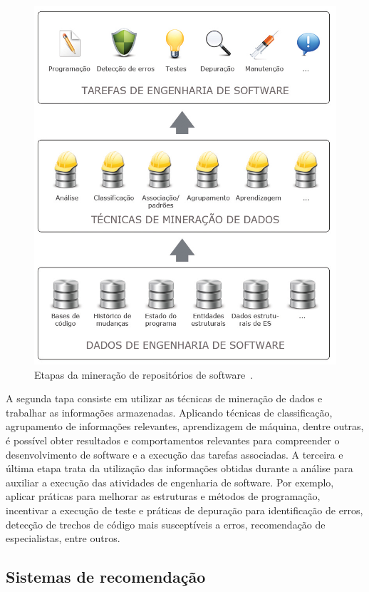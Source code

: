 \documentclass[oneside,brazil,a4paper]{normas-utf-tex}
\begin{document}
\begin{figure}[hbt]
        \centering
        \includegraphics[width= .8\textwidth]{figuras/mineracao}
        \caption[Etapas da mineração de repositórios de software.]{Etapas da mineração de repositórios de software~\cite{Cortes-etal:2002}.}
        \label{fig:mine}
\end{figure}

A segunda tapa consiste em utilizar as técnicas de mineração de dados e trabalhar as informações armazenadas. Aplicando técnicas de classificação, agrupamento de informações relevantes, aprendizagem de máquina, dentre outras, é possível obter resultados e comportamentos relevantes para compreender o desenvolvimento de software e a execução das tarefas associadas. A terceira e última etapa trata da utilização das informações obtidas durante a análise para auxiliar a execução das atividades de engenharia de software. Por exemplo, aplicar práticas para melhorar as estruturas e métodos de programação, incentivar a execução de teste e práticas de depuração para identificação de erros, detecção de trechos de código mais susceptíveis a erros, recomendação de especialistas, entre outros.


\subsection{Sistemas de recomendação}
\end{document}
